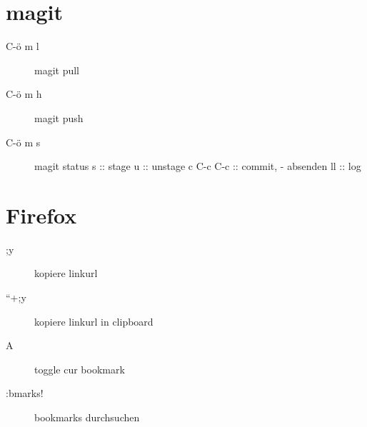 \documentclass[11pt]{article}
\begin{document}
\section{magit}
\label{sec-11}

\begin{description}
\item[C-ö m l] magit pull
\item[C-ö m h] magit push
\item[C-ö m s] magit status
    s         :: stage
    u         :: unstage
    c C-c C-c :: commit, - absenden
    ll        :: log
\end{description}
                 
\section{Firefox}
\label{sec-12}

\begin{description}
\item[;y] kopiere linkurl
\item[``+;y] kopiere linkurl in clipboard
\item[A] toggle cur bookmark
\item[:bmarks!] bookmarks durchsuchen
\end{description}
\end{document}
